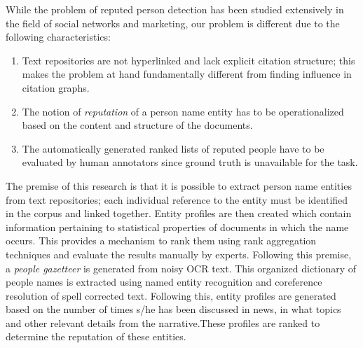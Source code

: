 \documentclass[a4paper,man,natbib]{apa6}
\begin{document}
While the problem of reputed person detection has been studied extensively in the field of social networks and marketing, our problem is different due to the following characteristics:
\begin{enumerate}
\item Text repositories are not hyperlinked and lack explicit citation structure; this makes the problem at hand fundamentally different from finding influence in citation graphs. 
\item The notion of \emph{reputation} of a person name entity has to be operationalized based on the content and structure of the documents.
\item  The automatically generated ranked lists of reputed people have to be evaluated by human annotators since ground truth is unavailable for the task.  
\end{enumerate}

The premise of this research is that it is possible to extract person name entities from text repositories; each individual reference to the entity must be identified in the corpus and linked together. Entity profiles are then created which contain information pertaining to statistical properties of documents in which the name occurs. This provides a mechanism to rank them using rank aggregation techniques and evaluate the results manually by experts. Following this premise, a \emph{people gazetteer} is generated from noisy OCR text. This organized dictionary of people names is extracted using named entity recognition and coreference resolution of spell corrected text. Following this, entity profiles are generated based on the number of times s/he has been discussed in news, in what topics and other relevant details from the narrative.These profiles are ranked to determine the reputation of these entities. 

\end{document}
